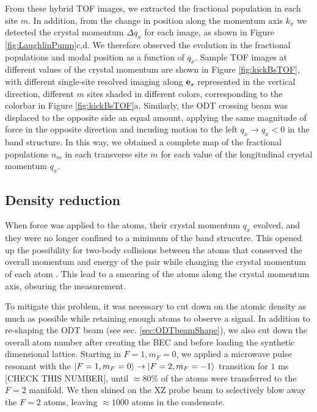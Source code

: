 From these hybrid TOF images, we extracted the fractional population in each site $m$. In addition, from the change in position along the momentum axis $k_x$ we detected the crystal momentum $\Delta q_x$ for each image, as shown in Figure \ref{fig:LaughlinPump}c,d.  We therefore observed the evolution in the fractional populations and modal position as a function of $q_x$. Sample TOF images at different values of the crystal momentum are shown in Figure \ref{fig:kickBsTOF}, with different single-site resolved imaging along $\textbf{e}_s{}$ represented in the vertical direction, different $m$ sites shaded in different colors, corresponding to the colorbar in Figure \ref{fig:kickBsTOF}a. Similarly, the ODT crossing beam was displaced to the opposite side an equal amount, applying the same magnitude of force in the opposite direction and incuding motion to the left  $q_x\rightarrow q_x<0$ in the band structure. In this way, we obtained a complete map of the fractional populations $n_m$ in each transverse site $m$ for each value of the longitudinal crystal momentum $q_x$.

\subsection{Density reduction}
When force was applied to the atoms, their crystal momentum $q_x$ evolved, and they were no longer confined to a minimum of the band strucutre. This opened up the possibility for two-body collisions between the atoms that conserved the overall momentum and energy of the pair while changing the crystal momentum of each atom \cite{Campbell2006}. This lead to a smearing of the atoms along the crystal momentum axis, obsuring the measurement. 

To mitigate this problem, it was necessary to cut down on the atomic density as much as possible while retaining enough atoms to observe a signal. In addition to re-shaping the ODT beam (see sec. \ref{sec:ODTbeamShape}), we also cut down the overall atom number after creating the BEC and before loading the synthetic dimensional lattice. Starting in $F=1, m_F=0$, we applied a microwave pulse resonant with the $\mathinner{|{F=1,m_F=0}\rangle}\rightarrow\mathinner{|{F=2,m_F=-1}\rangle}$ transition for $1$ ms [CHECK THIS NUMBER], until $\approx80\%$ of the atoms were transferred to the $F=2$ manifold. We then shined on the XZ probe beam to selectively blow away the $F=2$ atoms, leaving $\approx 1000$ atoms in the condensate.  

